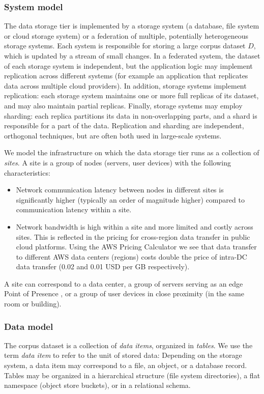\subsubsection{System model}
The data storage tier is implemented by a storage system (a database, file system or cloud storage system) or a
federation of multiple, potentially heterogeneous storage systems.
Each system is responsible for storing a large corpus dataset $D$, which is updated by a stream of small changes.
In a federated system, the dataset of each storage system is independent, but the application logic may implement
replication across different systems (for example an application that replicates data across multiple cloud providers).
In addition, storage systems implement replication:
each storage system maintains one or more full replicas of its dataset, and may also maintain partial replicas.
Finally, storage systems may employ sharding:
each replica partitions its data in non-overlapping parts, and a shard is responsible
for a part of the data.
Replication and sharding are independent, orthogonal techniques, but are often both used in large-scale systems.

We model the infrastructure on which the data storage tier runs as a collection of \textit{sites}.
A site is a group of nodes (servers, user devices) with the following characteristics:
\begin{itemize}
  \item Network communication latency between nodes in different sites is significantly higher (typically an order of
  magnitude higher) \cite{pbailis:hats} compared to communication latency within a site.
  \item Network bandwidth is high within a site and more limited and costly across sites.
  This is reflected in the pricing for cross-region data transfer in public cloud platforms.
  Using the AWS Pricing Calculator \cite{aws:costcalc} we see that data transfer to different AWS data centers
  (regions) costs double the price of intra-DC data transfer (0.02 and 0.01 USD per GB respectively).
\end{itemize}

A site can correspond to a data center, a group of servers serving as an edge Point of Presence \cite{google:infra}, or
a group of user devices in close proximity (in the same room or building).


\subsubsection{Data model}
The corpus dataset is a collection of \textit{data items}, organized in \textit{tables}.
We use the term \textit{data item} to refer to the unit of stored data:
Depending on the storage system, a data item may correspond to a file, an object, or a database record.
Tables may be organized in a hierarchical structure (file system directories), a flat namespace (object store buckets),
or in a relational schema.

